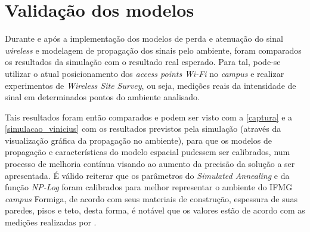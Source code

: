 \documentclass[
	12pt,				%
	twoside,			%
	a4paper,			%
	english,			%
	french,				%
	spanish,			%
	brazil				%
	]{abntex2}
\begin{document}
\section{Validação dos modelos}\label{validauxe7uxe3o-dos-modelos}

Durante e após a implementação dos modelos de perda e atenuação do sinal
\emph{wireless} e modelagem de propagação dos sinais pelo ambiente,
foram comparados os resultados da simulação com o resultado real
esperado. Para tal, pode-se utilizar o atual posicionamento dos
\emph{access points} \emph{Wi-Fi} no \emph{campus} e realizar
experimentos de \emph{Wireless Site Survey}, ou seja, medições reais da
intensidade de sinal em determinados pontos do ambiente analisado.

Tais resultados foram então comparados e podem ser visto com a
\autoref{captura} e a \autoref{simulacao_vinicius} com os resultados
previstos pela simulação (através da visualização gráfica da propagação
no ambiente), para que os modelos de propagação e características do
modelo espacial pudessem ser calibrados, num processo de melhoria
contínua visando ao aumento da precisão da solução a ser apresentada. É
válido reiterar que os parâmetros do \emph{Simulated Annealing} e da
função \emph{NP-Log} foram calibrados para melhor representar o ambiente
do IFMG \emph{campus} Formiga, de acordo com seus materiais de
construção, espessura de suas paredes, pisos e teto, desta forma, é
notável que os valores estão de acordo com as medições realizadas por
\cite{VINICIUS}.
\end{document}
